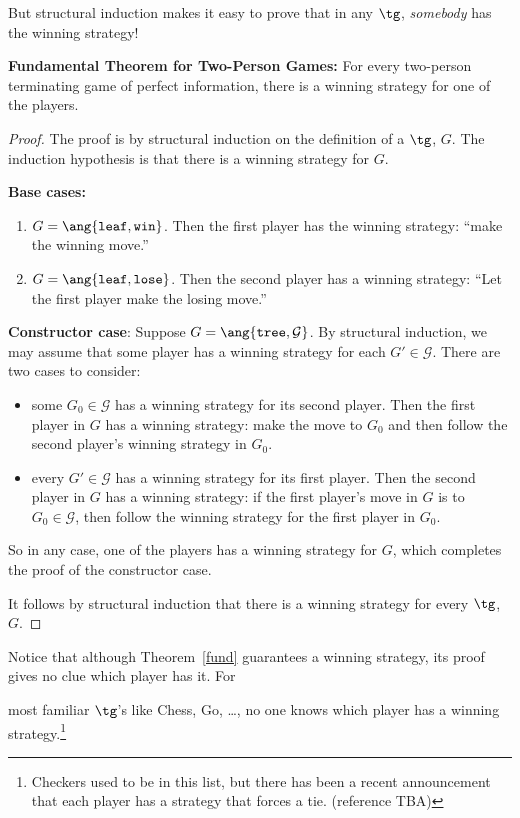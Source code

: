 \begin{definition}
But structural induction makes it easy to prove that in any $\tg$,
\emph{somebody} has the winning strategy!

\begin{theorem}\label{fund}
\textbf{Fundamental Theorem for Two-Person Games:} For every two-person
terminating game of perfect information, there is a winning strategy for
one of the players.
\end{theorem}

\begin{proof}
The proof is by structural induction on the definition of a $\tg$, $G$.
The induction hypothesis is that there is a winning strategy for $G$.

\textbf{Base cases:}
\begin{enumerate}

\item $G=\ang{\texttt{leaf}, \texttt{win}}$.  Then the first player has the
 winning strategy: ``make the winning move.''

\item $G=\ang{\texttt{leaf}, \texttt{lose}}$.  Then the second player has a
 winning strategy: ``Let the first player make the losing move.''
\end{enumerate}

\textbf{Constructor case}: Suppose $G = \ang{\texttt{tree},\mathcal{G}}$.
By structural induction, we may assume that some player has a winning
strategy for each $G' \in \mathcal{G}$.  There are two cases to consider:
\begin{itemize}
\item some $G_0 \in \mathcal{G}$ has a winning strategy for its second
  player.  Then the first player in $G$ has a winning strategy: make the
  move to $G_0$ and then follow the second player's winning strategy in
  $G_0$.

\item every $G' \in \mathcal{G}$ has a winning strategy for its first
  player.  Then the second player in $G$ has a winning strategy: if the
  first player's move in $G$ is to $G_0 \in \mathcal{G}$, then follow the
  winning strategy for the first player in $G_0$.
\end{itemize}
So in any case, one of the players has a winning strategy for $G$, which
completes the proof of the constructor case.

It follows by structural induction that there is a winning strategy for
every $\tg$, $G$.
\end{proof}

Notice that although Theorem~\ref{fund} guarantees a winning strategy, its
proof gives no clue which player has it.  For
\iffalse the Subset Takeaway Game
(\href{http://courses.csail.mit.edu/6.042/fall07/rec3t.pdf} {Recitation
Problem, Tuesday, Week 3}), and
\fi
most familiar $\tg$'s like Chess, Go, \dots, no one knows
which player has a winning strategy.\footnote{Checkers used to be in this
  list, but there has been a recent announcement that each player has a
  strategy that forces a tie. (reference TBA)}


\end{definition}
